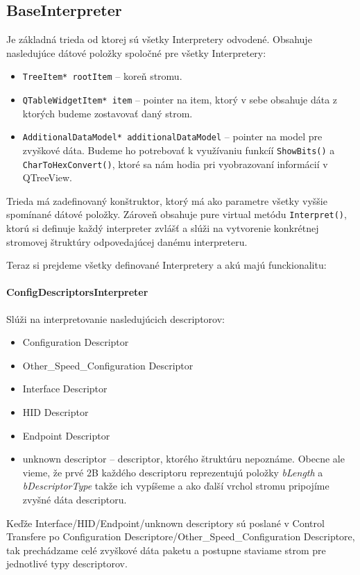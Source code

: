 \subsection{BaseInterpreter}
Je základná trieda od ktorej sú všetky Interpretery odvodené. Obsahuje nasledujúce dátové položky spoločné pre všetky Interpretery:
\begin{itemize}
\item \texttt{TreeItem* rootItem} -- koreň stromu.
\item \texttt{QTableWidgetItem* item} -- pointer na item, ktorý v sebe obsahuje dáta z ktorých budeme zostavovať daný strom.
\item \texttt{AdditionalDataModel* additionalDataModel} -- pointer na model \newline pre zvyškové dáta. Budeme ho potrebovať k využívaniu funkcíí \texttt{ShowBits()} a \texttt{CharToHexConvert()}, ktoré sa nám hodia pri vyobrazovaní informácií v QTreeView.
\end{itemize}

Trieda má zadefinovaný konštruktor, ktorý má ako parametre všetky vyššie spomínané dátové položky. Zároveň obsahuje pure virtual metódu \texttt{Interpret()}, ktorú si definuje každý interpreter zvlášť a slúži na vytvorenie konkrétnej stromovej štruktúry odpovedajúcej danému interpreteru.

Teraz si prejdeme všetky definované Interpretery a akú majú funckionalitu:

\paragraph{ConfigDescriptorsInterpreter}
\hfill \break
Slúži na interpretovanie nasledujúcich descriptorov:
\begin{itemize}
\item Configuration Descriptor
\item Other\_Speed\_Configuration Descriptor
\item Interface Descriptor
\item HID Descriptor
\item Endpoint Descriptor
\item unknown descriptor -- descriptor, ktorého štruktúru nepoznáme. Obecne ale vieme, že prvé 2B každého descriptoru reprezentujú položky \textit{bLength} a \textit{bDescriptorType} takže ich vypíšeme a ako ďalší vrchol stromu pripojíme zvyšné dáta descriptoru.
\end{itemize}
Keďže Interface/HID/Endpoint/unknown descriptory sú poslané v Control Tran\-sfere po Configuration Descriptore/Other\_Speed\_Configuration Descriptore, tak prechádzame celé zvyškové dáta paketu a postupne staviame strom pre jednotlivé typy descriptorov.

